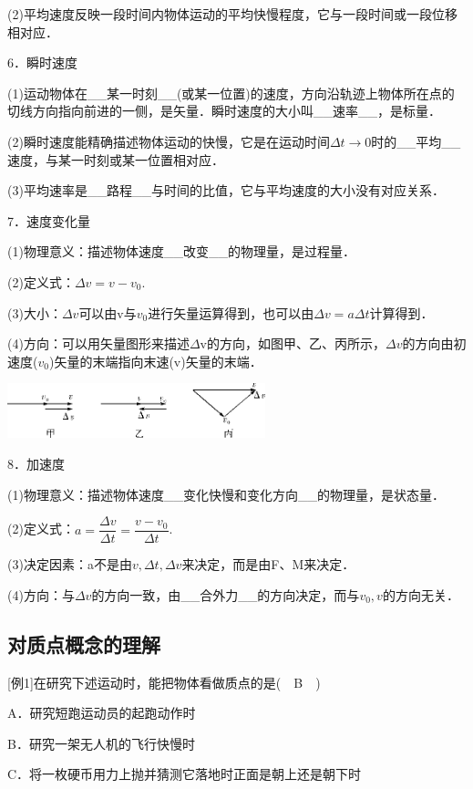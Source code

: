 \documentclass[cn,10.5pt,chinese,mac,chinesefont=founder]{elegantbook}
\begin{document}
(2)平均速度反映一段时间内物体运动的平均快慢程度，它与一段时间或一段位移相对应．

6．瞬时速度

(1)运动物体在\_\_某一时刻\_\_(或某一位置)的速度，方向沿轨迹上物体所在点的切线方向指向前进的一侧，是矢量．瞬时速度的大小叫\_\_速率\_\_，是标量．

(2)瞬时速度能精确描述物体运动的快慢，它是在运动时间$\Delta t \rightarrow 0$时的\_\_平均\_\_速度，与某一时刻或某一位置相对应．

(3)平均速率是\_\_路程\_\_与时间的比值，它与平均速度的大小没有对应关系．

7．速度变化量

(1)物理意义：描述物体速度\_\_改变\_\_的物理量，是过程量．

(2)定义式：$\Delta v=v-v_{0}$.

(3)大小：$\Delta v$可以由v与$v_{0}$进行矢量运算得到，也可以由$\Delta v=a \Delta t$计算得到．

(4)方向：可以用矢量图形来描述$\Delta$v的方向，如图甲、乙、丙所示，$\Delta v$的方向由初速度($v_{0}$)矢量的末端指向末速(v)矢量的末端．

\begin{center}\includegraphics[width=2.94792in,height=0.625in]{media/image5.png}\end{center}
8．加速度

(1)物理意义：描述物体速度\_\_变化快慢和变化方向\_\_的物理量，是状态量．

(2)定义式：$a=\dfrac{\Delta v}{\Delta t}=\dfrac{v-v_{0}}{\Delta t}$.

(3)决定因素：a不是由$v, \Delta t, \Delta v$来决定，而是由F、M来决定．

(4)方向：与$\Delta v$的方向一致，由\_\_合外力\_\_的方向决定，而与$v_{0},v$的方向无关．

\newpage
\subsection{对质点概念的理解}
{[}例1{]}在研究下述运动时，能把物体看做质点的是(　B　)

A．研究短跑运动员的起跑动作时

B．研究一架无人机的飞行快慢时

C．将一枚硬币用力上抛并猜测它落地时正面是朝上还是朝下时
\end{document}
